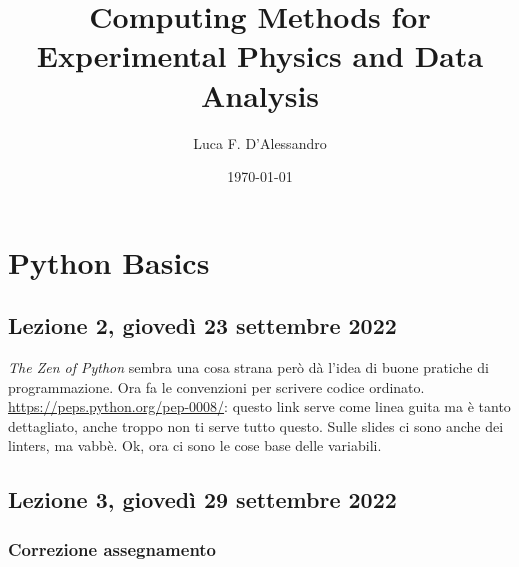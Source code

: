 \documentclass[10pt, a4paper, twosided, titlepage, draft]{book}
\title{Computing Methods for Experimental Physics and Data Analysis}
\author{Luca F. D'Alessandro}
\date{\today}
\begin{document}
\maketitle

\tableofcontents

\chapter{Python Basics}

\section{Lezione 2, giovedì 23 settembre 2022}

\emph{The Zen of Python} sembra una cosa strana però dà l'idea di buone pratiche di programmazione.
Ora fa le convenzioni per scrivere codice ordinato.
\url{https://peps.python.org/pep-0008/}:
questo link serve come linea guita ma è tanto dettagliato, anche troppo non ti serve tutto questo.
Sulle slides ci sono anche dei linters, ma vabbè.
Ok, ora ci sono le cose base delle variabili.


\section{Lezione 3, giovedì 29 settembre 2022}

\subsection{Correzione assegnamento}
\end{document}
